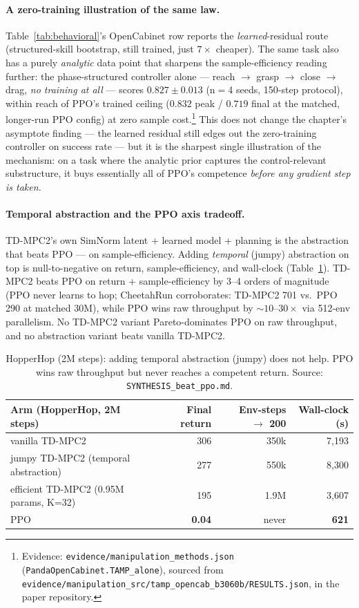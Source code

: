 \documentclass{article}
\begin{document}
\paragraph{A zero-training illustration of the same law.}
Table~\ref{tab:behavioral}'s OpenCabinet row reports the \emph{learned}-residual
route (structured-skill bootstrap, still trained, just $7\times$ cheaper). The
same task also has a purely \emph{analytic} data point that sharpens the
sample-efficiency reading further: the phase-structured controller alone ---
reach $\to$ grasp $\to$ close $\to$ drag, \emph{no training at all} --- scores
$0.827\pm0.013$ (n$=$4 seeds, 150-step protocol), within reach of PPO's trained
ceiling ($0.832$ peak / $0.719$ final at the matched, longer-run PPO config) at
zero sample cost.\footnote{Evidence: \texttt{evidence/manipulation\_methods.json}
(\texttt{PandaOpenCabinet.TAMP\_alone}), sourced from
\texttt{evidence/manipulation\_src/tamp\_opencab\_b3060b/RESULTS.json}, in the
paper repository.} This does not change the chapter's asymptote finding --- the
learned residual still edges out the zero-training controller on success rate
--- but it is the sharpest single illustration of the mechanism: on a task
where the analytic prior captures the control-relevant substructure, it buys
essentially all of PPO's competence \emph{before any gradient step is taken.}

\paragraph{Temporal abstraction and the PPO axis tradeoff.}
TD-MPC2's own SimNorm latent + learned model + planning is the abstraction that
beats PPO --- on sample-efficiency. Adding \emph{temporal} (jumpy) abstraction on
top is null-to-negative on return, sample-efficiency, and wall-clock
(Table~\ref{tab:pareto}). TD-MPC2 beats PPO on return + sample-efficiency by 3--4
orders of magnitude (PPO never learns to hop; CheetahRun corroborates: TD-MPC2 701
vs.\ PPO 290 at matched 30M), while PPO wins raw throughput by ${\sim}10$--$30\times$
via 512-env parallelism. No TD-MPC2 variant Pareto-dominates PPO on raw throughput,
and no abstraction variant beats vanilla TD-MPC2.

\begin{table}[t]
\centering
\caption{HopperHop (2M steps): adding temporal abstraction (jumpy) does not help.
PPO wins raw throughput but never reaches a competent return. Source:
\texttt{SYNTHESIS\_beat\_ppo.md}.}
\label{tab:pareto}
\begin{tabular}{lrrr}
\toprule
Arm (HopperHop, 2M steps) & Final return & Env-steps $\to$ 200 & Wall-clock (s) \\
\midrule
vanilla TD-MPC2                       & 306 & 350k & 7{,}193 \\
jumpy TD-MPC2 (temporal abstraction)  & 277 & 550k & 8{,}300 \\
efficient TD-MPC2 (0.95M params, K=32) & 195 & 1.9M & 3{,}607 \\
PPO                                   & \textbf{0.04} & never & \textbf{621} \\
\bottomrule
\end{tabular}
\end{table}
\end{document}
